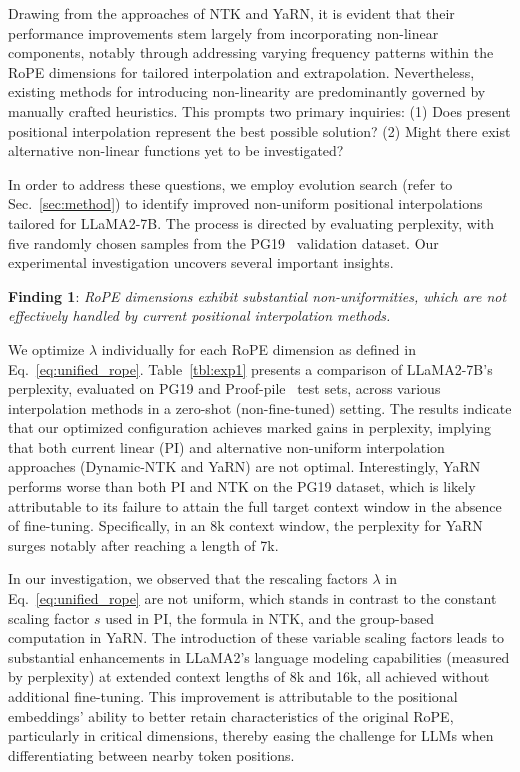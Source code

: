 Drawing from the approaches of NTK and YaRN, it is evident that their performance improvements stem largely from incorporating non-linear components, notably through addressing varying frequency patterns within the RoPE dimensions for tailored interpolation and extrapolation. Nevertheless, existing methods for introducing non-linearity are predominantly governed by manually crafted heuristics. This prompts two primary inquiries: (1) Does present positional interpolation represent the best possible solution? (2) Might there exist alternative non-linear functions yet to be investigated?

In order to address these questions, we employ evolution search (refer to Sec.~\ref{sec:method}) to identify improved non-uniform positional interpolations tailored for LLaMA2-7B. The process is directed by evaluating perplexity, with five randomly chosen samples from the PG19~\cite{pg19} validation dataset. Our experimental investigation uncovers several important insights.

\textbf{Finding 1}: \textit{RoPE dimensions exhibit substantial non-uniformities, which are not effectively handled by current positional interpolation methods.}

We optimize $\lambda$ individually for each RoPE dimension as defined in Eq.~\ref{eq:unified_rope}. Table~\ref{tbl:exp1} presents a comparison of LLaMA2-7B’s perplexity, evaluated on PG19 and Proof-pile~\cite{proof-pile} test sets, across various interpolation methods in a zero-shot (non-fine-tuned) setting. The results indicate that our optimized configuration achieves marked gains in perplexity, implying that both current linear (PI) and alternative non-uniform interpolation approaches (Dynamic-NTK and YaRN) are not optimal. Interestingly, YaRN performs worse than both PI and NTK on the PG19 dataset, which is likely attributable to its failure to attain the full target context window in the absence of fine-tuning. Specifically, in an 8k context window, the perplexity for YaRN surges notably after reaching a length of 7k.

In our investigation, we observed that the rescaling factors $\lambda$ in Eq.~\ref{eq:unified_rope} are not uniform, which stands in contrast to the constant scaling factor $s$ used in PI, the formula in NTK, and the group-based computation in YaRN. The introduction of these variable scaling factors leads to substantial enhancements in LLaMA2's language modeling capabilities (measured by perplexity) at extended context lengths of 8k and 16k, all achieved without additional fine-tuning. This improvement is attributable to the positional embeddings' ability to better retain characteristics of the original RoPE, particularly in critical dimensions, thereby easing the challenge for LLMs when differentiating between nearby token positions.

